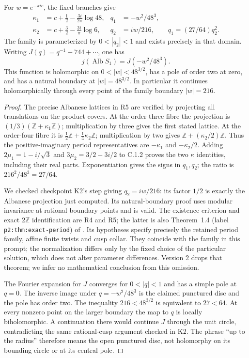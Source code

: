 \begin{statement}
For $w=e^{-\pi ic}$, the fixed branches give
\begin{align*}
 \kappa_1&=c+\tfrac12-\frac{3i}{2\pi}\log48,&
 q_1&=-w^2/48^3,\\
 \kappa_2&=c+\tfrac32-\frac{3i}{\pi}\log6,&
 q_2&=iw/216,\qquad q_1=(27/64)q_2^2.
\end{align*}
The family is parameterized by $0<|q_2|<1$ and exists precisely in
that domain. Writing $J(q)=q^{-1}+744+\cdots$, one has
\[
 j(\operatorname{Alb}S_1)=J(-w^2/48^3).
\]
This function is holomorphic on $0<|w|<48^{3/2}$, has a pole of order
two at zero, and has a natural boundary at $|w|=48^{3/2}$.
In particular it continues holomorphically through every point of the
family boundary $|w|=216$.
\end{statement}
\begin{proof}
The precise Albanese lattices in R5 are verified by projecting all
translations on the product covers. At the order-three fibre the
projection is $(1/3)(\mathbb Z+\kappa_1\mathbb Z)$; multiplication by
three gives the first stated lattice. At the order-four fibre it is
$\tfrac12\mathbb Z+\tfrac14\kappa_2\mathbb Z$; multiplication by two
gives $\mathbb Z+(\kappa_2/2)\mathbb Z$. Thus the positive-imaginary
period representatives are $-\kappa_1$ and $-\kappa_2/2$.
Adding $2\mu_1=1-i/\sqrt3$ and
$3\mu_2=3/2-3i/2$ to C.1.2 proves the two $\kappa$ identities,
including their real parts. Exponentiation gives the signs in $q_1,q_2$;
the ratio is $216^2/48^3=27/64$.

We checked checkpoint K2's step giving $q_2=iw/216$: its factor
$1/2$ is exactly the Albanese projection just computed. Its
natural-boundary proof uses modular invariance at rational boundary
points and is valid. The existence criterion and exact $2\mathbb Z$
identification are R4 and R5; the latter is also Theorem~1.4
(label \texttt{p2:thm:exact-period}) of
\cite{DuGuoKusakabeXie2026v1}. Its hypotheses specify precisely the
retained period family, affine finite twists and cusp collar. They
coincide with the family in this prompt; the normalization differs
only by the fixed choice of the particular solution, which does not
alter parameter differences. Version 2 drops that theorem; we infer
no mathematical conclusion from this omission.

The Fourier expansion for $J$ converges for $0<|q|<1$ and has a simple
pole at $q=0$. The inverse image under $q=-w^2/48^3$ is the claimed
punctured disc and the pole has order two. The inequality
$216<48^{3/2}$ is equivalent to $27<64$. At every nonzero point on the
larger boundary the map to $q$ is locally biholomorphic. A continuation
there would continue $J$ through the unit circle, contradicting the
same rational-cusp argument checked in K2. The phrase ``up to the
radius'' therefore means the open punctured disc, not holomorphy on
its bounding circle or at its central pole.
\end{proof}

